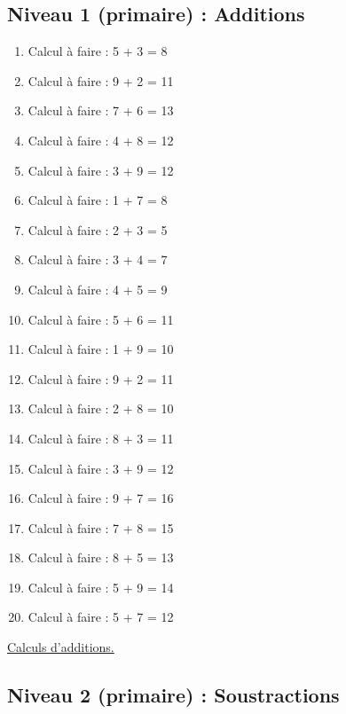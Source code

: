 \documentclass[11pt]{article}
\begin{document}
\subsection{Niveau 1 (primaire) : Additions}
\label{sec:org5b4a706}
\label{org44f358f}



\begin{enumerate}
\item Calcul à faire :  5 + 3 = 8
\item Calcul à faire :  9 + 2 = 11
\item Calcul à faire :  7 + 6 = 13
\item Calcul à faire :  4 + 8 = 12
\item Calcul à faire :  3 + 9 = 12
\item Calcul à faire :  1 + 7 = 8
\item Calcul à faire :  2 + 3 = 5
\item Calcul à faire :  3 + 4 = 7
\item Calcul à faire :  4 + 5 = 9
\item Calcul à faire :  5 + 6 = 11
\item Calcul à faire :  1 + 9 = 10
\item Calcul à faire :  9 + 2 = 11
\item Calcul à faire :  2 + 8 = 10
\item Calcul à faire :  8 + 3 = 11
\item Calcul à faire :  3 + 9 = 12
\item Calcul à faire :  9 + 7 = 16
\item Calcul à faire :  7 + 8 = 15
\item Calcul à faire :  8 + 5 = 13
\item Calcul à faire :  5 + 9 = 14
\item Calcul à faire :  5 + 7 = 12
\end{enumerate}




\hyperref[orge2529ac]{Calculs d'additions.}



\newpage


\subsection{Niveau 2 (primaire) : Soustractions}
\label{sec:org045c6cf}
\label{org80ff65c}
\end{document}

